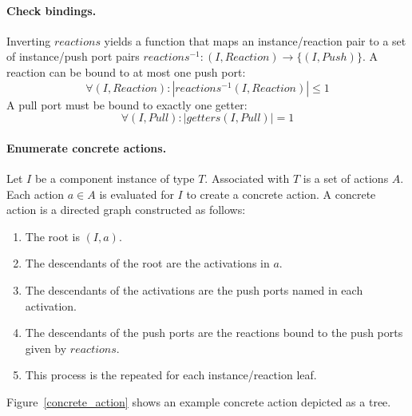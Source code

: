 \paragraph{Check bindings.}
Inverting $reactions$ yields a function that maps an instance/reaction pair to a set of instance/push port pairs $reactions^{-1}: (I,Reaction) \to \{(I,Push)\}$.
A reaction can be bound to at most one push port:
\begin{displaymath}
\forall (I,Reaction) : |reactions^{-1} (I,Reaction)| \leq 1
\end{displaymath}
A pull port must be bound to exactly one getter:
\begin{displaymath}
\forall (I,Pull) : |getters (I,Pull)| = 1
\end{displaymath}

\paragraph{Enumerate concrete actions.}
Let $I$ be a component instance of type $T$.
Associated with $T$ is a set of actions $A$.
Each action $a \in A$ is evaluated for $I$ to create a concrete action.
A concrete action is a directed graph constructed as follows:
\begin{enumerate}
\item The root is $(I,a)$.
\item The descendants of the root are the activations in $a$.
\item The descendants of the activations are the push ports named in each activation.
\item The descendants of the push ports are the reactions bound to the push ports given by $reactions$.
\item This process is the repeated for each instance/reaction leaf.
\end{enumerate}
Figure~\ref{concrete_action} shows an example concrete action depicted as a tree.

